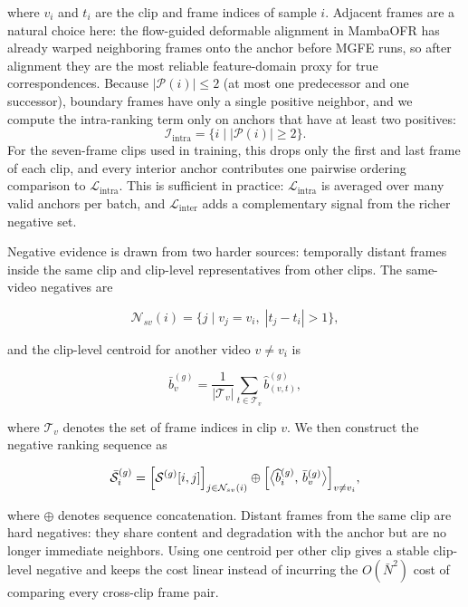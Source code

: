 where $v_i$ and $t_i$ are the clip and frame indices of sample $i$. Adjacent frames are a natural choice here: the flow-guided deformable alignment in MambaOFR has already warped neighboring frames onto the anchor before MGFE runs, so after alignment they are the most reliable feature-domain proxy for true correspondences. Because $|\mathcal{P}(i)| \le 2$ (at most one predecessor and one successor), boundary frames have only a single positive neighbor, and we compute the intra-ranking term only on anchors that have at least two positives:
\begin{equation}
\mathcal{I}_{\text{intra}}=
\bigl\{
i \mid |\mathcal{P}(i)| \ge 2
\bigr\}.
\end{equation}
For the seven-frame clips used in training, this drops only the first and last frame of each clip, and every interior anchor contributes one pairwise ordering comparison to $\mathcal{L}_{\text{intra}}$. This is sufficient in practice: $\mathcal{L}_{\text{intra}}$ is averaged over many valid anchors per batch, and $\mathcal{L}_{\text{inter}}$ adds a complementary signal from the richer negative set.

Negative evidence is drawn from two harder sources: temporally distant frames inside the same clip and clip-level representatives from other clips. The same-video negatives are

\begin{equation}
\mathcal{N}_{sv}(i)=
\bigl\{
j \mid v_j=v_i,\;
|t_j-t_i|>1
\bigr\},
\end{equation}

and the clip-level centroid for another video $v\neq v_i$ is

\begin{equation}
\bar{b}_{v}^{(g)} =
\frac{1}{|\mathcal{T}_v|}
\sum_{t\in\mathcal{T}_v}
\widehat{b}_{(v,t)}^{(g)},
\end{equation}

where $\mathcal{T}_v$ denotes the set of frame indices in clip $v$. We then construct the negative ranking sequence as

\begin{equation}
\bar{\mathcal{S}}_i^{(g)} =
\Bigl[\mathcal{S}^{(g)}[i,j]\Bigr]_{j\in\mathcal{N}_{sv}(i)}
\oplus
\Bigl[\bigl\langle \widehat{b}_i^{(g)},\,\bar{b}_v^{(g)} \bigr\rangle\Bigr]_{v\neq v_i},
\end{equation}

where $\oplus$ denotes sequence concatenation. Distant frames from the same clip are hard negatives: they share content and degradation with the anchor but are no longer immediate neighbors. Using one centroid per other clip gives a stable clip-level negative and keeps the cost linear instead of incurring the $O(\bar{N}^2)$ cost of comparing every cross-clip frame pair.

